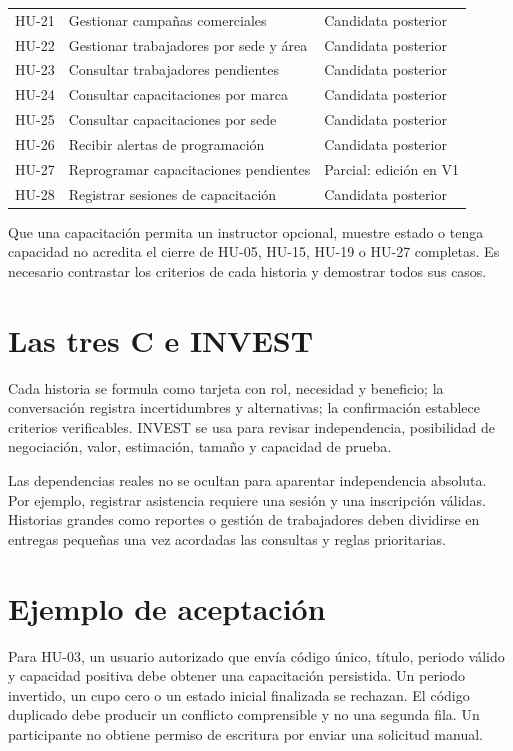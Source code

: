 \begin{longtable}{P{1.5cm}P{8.1cm}P{3.1cm}}
HU-21 & Gestionar campañas comerciales & Candidata posterior \\
HU-22 & Gestionar trabajadores por sede y área & Candidata posterior \\
HU-23 & Consultar trabajadores pendientes & Candidata posterior \\
HU-24 & Consultar capacitaciones por marca & Candidata posterior \\
HU-25 & Consultar capacitaciones por sede & Candidata posterior \\
HU-26 & Recibir alertas de programación & Candidata posterior \\
HU-27 & Reprogramar capacitaciones pendientes & Parcial: edición en V1 \\
HU-28 & Registrar sesiones de capacitación & Candidata posterior \\
\bottomrule
\end{longtable}

Que una capacitación permita un instructor opcional, muestre estado o tenga capacidad no acredita el cierre de HU-05, HU-15, HU-19 o HU-27 completas. Es necesario contrastar los criterios de cada historia y demostrar todos sus casos.

\section{Las tres C e INVEST}
Cada historia se formula como tarjeta con rol, necesidad y beneficio; la conversación registra incertidumbres y alternativas; la confirmación establece criterios verificables. INVEST se usa para revisar independencia, posibilidad de negociación, valor, estimación, tamaño y capacidad de prueba.

Las dependencias reales no se ocultan para aparentar independencia absoluta. Por ejemplo, registrar asistencia requiere una sesión y una inscripción válidas. Historias grandes como reportes o gestión de trabajadores deben dividirse en entregas pequeñas una vez acordadas las consultas y reglas prioritarias.

\section{Ejemplo de aceptación}
Para HU-03, un usuario autorizado que envía código único, título, periodo válido y capacidad positiva debe obtener una capacitación persistida. Un periodo invertido, un cupo cero o un estado inicial finalizada se rechazan. El código duplicado debe producir un conflicto comprensible y no una segunda fila. Un participante no obtiene permiso de escritura por enviar una solicitud manual.

